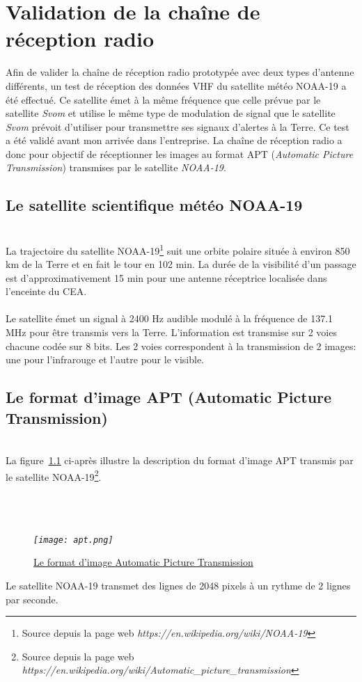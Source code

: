 \documentclass[12pt,fleqn]{book} %
\begin{document}
\chapter{Validation de la chaîne de réception radio}
Afin de valider la chaîne de réception radio prototypée avec deux types d'antenne différents, un test de réception des données VHF du satellite météo NOAA-19 a été effectué. Ce satellite émet à la même fréquence que celle prévue par le satellite \emph{Svom} et utilise le même type de modulation de signal que le satellite \emph{Svom} prévoit d'utiliser pour transmettre ses signaux d'alertes à la Terre. Ce test a été validé avant mon arrivée dans l'entreprise.
La chaîne de réception radio a donc pour objectif de réceptionner les images au format APT (\emph{Automatic Picture Transmission}) transmises par le satellite \emph{NOAA-19}.
\section{Le satellite scientifique météo NOAA-19}
~\\\indent La trajectoire du satellite NOAA-19\footnote{Source depuis la page web \emph{https://en.wikipedia.org/wiki/NOAA-19}} suit une orbite polaire située à environ 850 km de la Terre et en fait le tour en 102 min. La durée de la visibilité d'un passage est d'approximativement 15 min pour une antenne réceptrice localisée dans l'enceinte du CEA.
~\\\\Le satellite émet un signal à 2400 Hz audible modulé à la fréquence de 137.1 MHz pour être transmis vers la Terre. L'information est transmise sur 2 voies chacune codée sur 8 bits. Les 2 voies correspondent à la transmission de 2 images: une pour l'infrarouge et l'autre pour le visible.
\section{Le format d'image APT (Automatic Picture Transmission)}
~\\\indent La figure~\underline{\color{blue}\ref{apt}} ci-après illustre la description du format d'image APT transmis par le satellite NOAA-19\footnote{Source depuis la page web \emph{https://en.wikipedia.org/wiki/Automatic\_picture\_transmission}}.
~\\\\
~\\\\
\begin{figure}[H]
	\centering
	\itshape
	\texttt{[image: apt.png]}
	\caption{\label{apt} \underline{Le format d'image Automatic Picture Transmission}}
\end{figure}
Le satellite NOAA-19 transmet des lignes de 2048 pixels à un rythme de 2 lignes par seconde.
\end{document}
